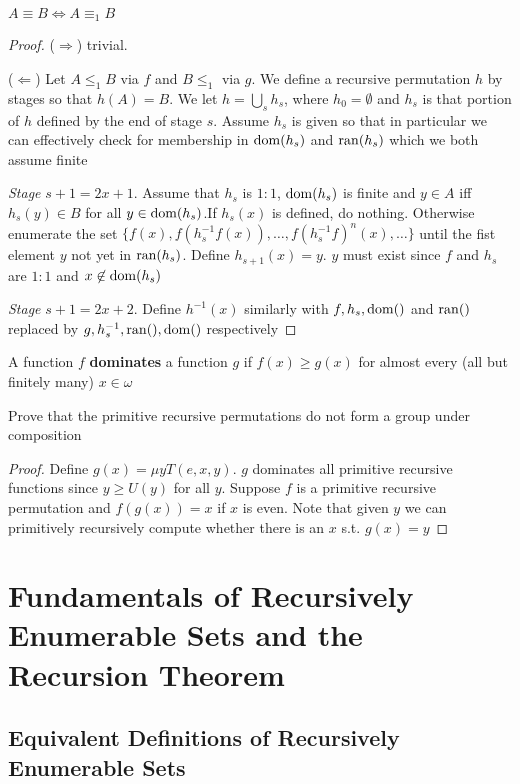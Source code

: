 \documentclass[11pt]{article}
\begin{document}
\begin{theorem}
\(A\equiv B\Longleftrightarrow A\equiv_1 B\)
\end{theorem}
\begin{proof}
(\(\Longrightarrow\)) trivial.

(\(\Longleftarrow\)) Let \(A\le_1 B\) via \(f\) and \(B\le_1\) via \(g\). We define a
recursive permutation \(h\) by stages so that \(h(A)=B\). We let
\(h=\bigcup_sh_s\), where \(h_0=\emptyset\) and \(h_s\) is that portion of \(h\)
defined by the end of stage \(s\). Assume \(h_s\) is given so that in particular
we can effectively check for membership in \(\mathrm{dom}{(h_s)}\) and \(\mathrm{ran}{(h_s)}\) which
we both assume finite

\emph{Stage} \(s+1=2x+1\). Assume that \(h_s\) is \(1:1\), \(\mathrm{dom}{(h_s)}\) is finite and \(y\in
   A\) iff \(h_s(y)\in B\) for all \(y\in\mathrm{dom}{(h_s)}\).If \(h_s(x)\) is defined, do
nothing. Otherwise enumerate the set
\(\{f(x),f(h_s^{-1}f(x)),\dots,f(h_s^{-1}f)^n(x),\dots\}\) until the fist
element \(y\) not yet in \(\mathrm{ran}{(h_s)}\). Define \(h_{s+1}(x)=y\). \(y\) must exist
since \(f\) and \(h_s\) are \(1:1\) and \(x\not\in\mathrm{dom}{(h_s)}\)

\emph{Stage} \(s+1=2x+2\). Define \(h^{-1}(x)\) similarly with \(f,h_s,\mathrm{dom}{()}\) and
\(\mathrm{ran}{()}\) replaced by \(g,h_s^{-1},\mathrm{ran}{()},\mathrm{dom}{()}\) respectively
\end{proof}

\begin{definition}[]
A function \(f\) \textbf{dominates} a function \(g\) if \(f(x)\ge g(x)\) for almost every
(all but finitely many) \(x\in\omega\)
\end{definition}

\begin{exercise}[$\times$]
Prove that the primitive recursive permutations do not form a group under composition
\end{exercise}
\begin{proof}
Define \(g(x)=\mu yT(e,x,y)\). \(g\) dominates all primitive recursive functions
since \(y\ge U(y)\) for all \(y\). Suppose \(f\) is a primitive recursive
permutation and \(f(g(x))=x\) if \(x\) is even. Note that given \(y\) we can
primitively recursively compute whether there is an \(x\) s.t. \(g(x)=y\)
\end{proof}
\section{Fundamentals of Recursively Enumerable Sets and the Recursion Theorem}
\label{sec:org129927f}
\subsection{Equivalent Definitions of Recursively Enumerable Sets}
\label{sec:orgaa28ca0}
\end{document}
